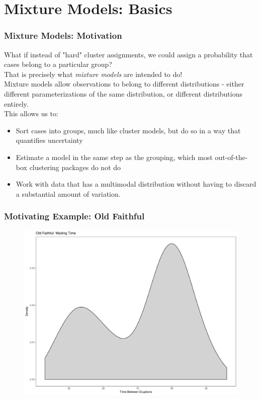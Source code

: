 \documentclass{beamer}
\begin{document}
\section{Mixture Models: Basics}

\begin{frame}
\frametitle{Mixture Models: Motivation}
	What if instead of "hard" cluster assignments, we could assign a probability that cases belong to a particular group?\\
	That is precisely what \textit{mixture models} are intended to do!\\
	Mixture models allow observations to belong to different distributions - either different parameterizations of the same distribution, or different distributions entirely.\\
	This allows us to:
	\begin{itemize}
		\item Sort cases into groups, much like cluster models, but do so in a way that quantifies uncertainty
		\item Estimate a model in the same step as the grouping, which most out-of-the-box clustering packages do not do
		\item Work with data that has a multimodal distribution without having to discard a substantial amount of variation. 
	\end{itemize}
\end{frame}

\begin{frame}
\frametitle{Motivating Example: Old Faithful}
	\begin{figure}
		\centering
		\includegraphics[width=0.7\linewidth,]{faithfulplot}
		\caption*{}
		\label{fig:faithfulplot}
	\end{figure}
	
\end{frame}
\end{document}

